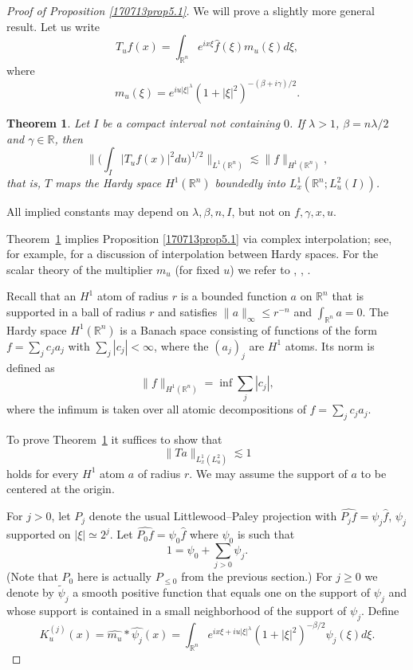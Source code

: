 \documentclass[12pt,leqno]{amsart}
\def\R{\mathbb{R}}
\theoremstyle{plain}
\newtheorem{thm}{Theorem}[section]
\numberwithin{equation}{section}
\begin{document}
\begin{proof}[Proof of Proposition \ref{170713prop5.1}]

We will prove a slightly more general result. Let us write
\[ T_u f(x) = \int_{\R^n} e^{ix\xi} \widehat{f}(\xi) m_u(\xi) d\xi,\]
where
\[m_u(\xi)=e^{iu|\xi|^{\lambda}} (1+|\xi|^2)^{-(\beta+i\gamma)/2}.\]
\begin{thm} \label{thm5.2}
Let $I$ be a compact interval not containing $0$. If $\lambda>1$, $\beta=n\lambda/2$ and $\gamma\in\R$, then 
\[ \Big\| \Big( \int_I |T_u f(x)|^2 du \Big)^{1/2} \Big\|_{L^1(\R^n)} \lesssim \|f\|_{H^1(\R^n)},\]
that is, $T$ maps the Hardy space $H^1(\R^n)$ boundedly into $L_x^1(\R^n; L_u^2(I))$.
\end{thm}
All implied constants may depend on $\lambda,\beta,n,I$, but not on $f,\gamma,x,u$.

Theorem~\ref{thm5.2} implies Proposition \ref{170713prop5.1} via complex interpolation; see, for example, \cite[Chapter IV.6.17]{MR1232192} for a discussion of interpolation between Hardy spaces.
For the scalar theory of the multiplier $m_u$ (for fixed $u$) we refer to \cite{Miy81}, \cite{FS72}, \cite{Fef70}.

Recall that an $H^1$ atom of radius $r$ is a bounded function  $a$ on $\R^n$ that is supported in a ball of radius $r$ and satisfies $\|a\|_\infty\le r^{-n}$ and $\int_{\R^n} a = 0$. The Hardy space $H^1(\R^n)$ is a Banach space consisting of functions of the form $f=\sum_{j} c_j a_j$ with $\sum_{j} |c_j|<\infty$, where the $(a_j)_j$ are $H^1$ atoms. Its norm is defined as
\[ \|f\|_{H^1(\R^n)} = \inf \sum_j |c_j|, \]
where the infimum is taken over all atomic decompositions of $f=\sum_j c_j a_j$.

To prove Theorem~\ref{thm5.2} it suffices to show that
\begin{equation}
\label{eqn:prop5.1.atomicest}
\| T a \|_{L_x^1(L_u^2)} \lesssim 1
\end{equation}
holds for every $H^1$ atom $a$ of radius $r$. We may assume the support of $a$ to be centered at the origin.

For $j>0$, let $P_j$ denote the usual Littlewood--Paley projection with $\widehat{P_j f}=\psi_j \widehat{f}$, $\psi_j$ supported on $|\xi| \simeq 2^j$. Let $\widehat{P_0 f}=\psi_{0} \widehat{f}$ where $\psi_0$ is such that
\[ 1 = \psi_{0} + \sum_{j>0} \psi_j. \] (Note that $P_0$ here is actually $P_{\leq 0}$ from the previous section.)
For $j\ge 0$ we denote by $\widetilde{\psi}_j$ a smooth positive function that equals one on the support of $\psi_j$ and whose support is contained in a small neighborhood of the support of $\psi_j$.
Define 
\[ K_u^{(j)} (x) =  \widehat{m_u}*\widehat{\psi_j} (x) = \int_{\R^n} e^{ix\xi+iu|\xi|^{\lambda}} (1+|\xi|^2)^{-\beta/2} \psi_j(\xi) d\xi. \]


\end{proof}
\end{document}
